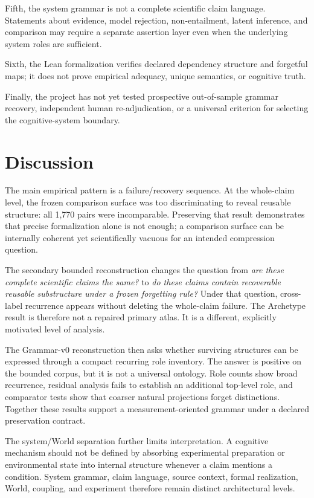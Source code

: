 \documentclass[11pt]{article}
\begin{document}
Fifth, the system grammar is not a complete scientific claim language. Statements about evidence, model rejection, non-entailment, latent inference, and comparison may require a separate assertion layer even when the underlying system roles are sufficient.

Sixth, the Lean formalization verifies declared dependency structure and forgetful maps; it does not prove empirical adequacy, unique semantics, or cognitive truth.

Finally, the project has not yet tested prospective out-of-sample grammar recovery, independent human re-adjudication, or a universal criterion for selecting the cognitive-system boundary.

\section{Discussion}

The main empirical pattern is a failure/recovery sequence. At the whole-claim level, the frozen comparison surface was too discriminating to reveal reusable structure: all 1,770 pairs were incomparable. Preserving that result demonstrates that precise formalization alone is not enough; a comparison surface can be internally coherent yet scientifically vacuous for an intended compression question.

The secondary bounded reconstruction changes the question from \emph{are these complete scientific claims the same?} to \emph{do these claims contain recoverable reusable substructure under a frozen forgetting rule?} Under that question, cross-label recurrence appears without deleting the whole-claim failure. The Archetype result is therefore not a repaired primary atlas. It is a different, explicitly motivated level of analysis.

The Grammar-v0 reconstruction then asks whether surviving structures can be expressed through a compact recurring role inventory. The answer is positive on the bounded corpus, but it is not a universal ontology. Role counts show broad recurrence, residual analysis fails to establish an additional top-level role, and comparator tests show that coarser natural projections forget distinctions. Together these results support a measurement-oriented grammar under a declared preservation contract.

The system/World separation further limits interpretation. A cognitive mechanism should not be defined by absorbing experimental preparation or environmental state into internal structure whenever a claim mentions a condition. System grammar, claim language, source context, formal realization, World, coupling, and experiment therefore remain distinct architectural levels.
\end{document}
